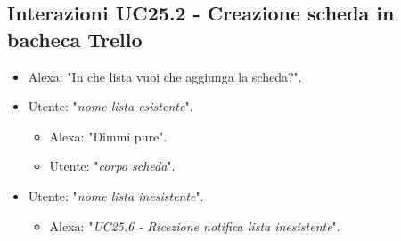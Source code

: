 \subsection{Interazioni UC25.2 - Creazione scheda in bacheca Trello}
\label{sec:connettore_trello_crea_bacheca}
 \begin{itemize}
        \item Alexa: "In che lista vuoi che aggiunga la scheda?".
        \item Utente: "{\it nome lista esistente}".
        \begin{itemize}
        \item Alexa: "Dimmi pure".
        \item Utente: "{\it corpo scheda}".
           \end{itemize}
        \item Utente: "{\it nome lista inesistente}".
           \begin{itemize}
        \item Alexa: "{\it UC25.6 - Ricezione notifica lista inesistente}".
           \end{itemize}
    \end{itemize}


